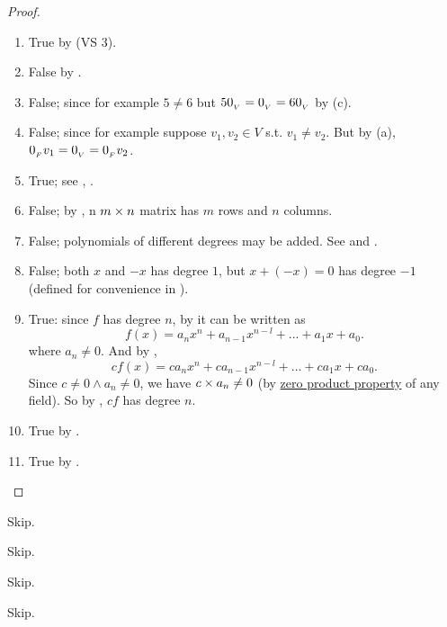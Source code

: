 \begin{proof}
\begin{enumerate}
\item True by (VS 3).
\item False by .
\item False; since for example \(5 \ne 6\) but \(5 0_{_V} = 0_{_V} = 6 0_{_V}\) by (c).
\item False; since for example suppose \(v_1, v_2 \in V\) s.t. \(v_1 \ne v_2\).
    But by (a), \(0_{_F} v_1 = 0_{_V} = 0_{_F} v_2\).
\item True; see , .
\item False; by , n \(m \times n\) matrix has \(m\) rows and \(n\) columns.
\item False; polynomials of different degrees may be added. See  and .
\item False; both \(x\) and \(-x\) has degree \(1\), but \(x + (-x) = 0\) has degree \(-1\) (defined for convenience in ).
\item True: since \(f\) has degree \(n\), by  it can be written as
    \[
        f(x) = {a_n} x^n + a_{n-1} x^{n-l} + ... + a_1 x + a_0.
    \]
    where \(a_n \ne 0\).
    And by ,
    \[
        cf(x) = c {a_n} x^n + c a_{n-1} x^{n-l} + ... + c a_1 x + c a_0.
    \]
    Since \(c \ne 0 \land a_n \ne 0\), we have \(c \times a_n \ne 0\) (by \href{https://www.wikiwand.com/en/Zero-product_property}{zero product property} of any field).
    So by , \(cf\) has degree \(n\).
\item True by .
\item True by .
\end{enumerate}
\end{proof}

\begin{exercise} \label{exercise 1.2.2}
Skip.
\end{exercise}

\begin{exercise} \label{exercise 1.2.3}
Skip.
\end{exercise}

\begin{exercise} \label{exercise 1.2.4}
Skip.
\end{exercise}

\begin{exercise} \label{exercise 1.2.5}
Skip.
\end{exercise}

